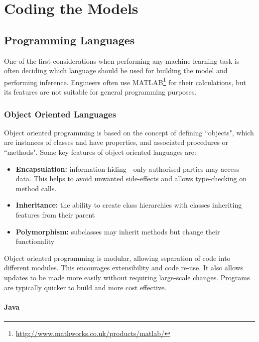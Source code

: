 \chapter{Coding the Models}\label{chap:codingTheModels}

\section{Programming Languages}

One of the first considerations when performing any machine learning task is often deciding which language should be used for building the model and performing inference. Engineers often use MATLAB\footnote{\url{http://www.mathworks.co.uk/products/matlab/}} for their calculations, but its features are not suitable for general programming purposes.

\subsection{Object Oriented Languages}

Object oriented programming is based on the concept of defining ``objects", which are instances of classes and have properties, and associated procedures or ``methods". Some key features of object oriented languages are:

\begin{itemize}

\item \textbf{Encapsulation:} information hiding - only authorised parties may access data. This helps to avoid unwanted side-effects and allows type-checking on method calls.
\item \textbf{Inheritance:} the ability to create class hierarchies with classes inheriting features from their parent
\item \textbf{Polymorphism:} subclasses may inherit methods but change their functionality

\end{itemize}

Object oriented programming is modular, allowing separation of code into different modules. This encourages extensibility and code re-use. It also allows updates to be made more easily without requiring large-scale changes. Programs are typically quicker to build and more cost effective.

\subsubsection{Java}

